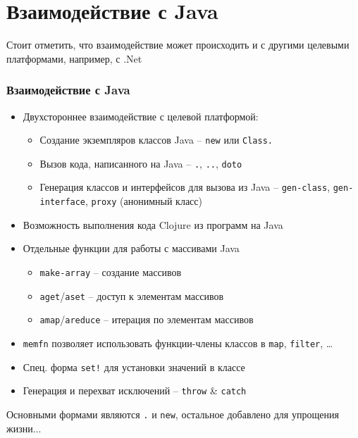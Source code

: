 \documentclass[ignorenonframetext]{beamer}
\begin{document}

\section{Взаимодействие с Java}

Стоит отметить, что взаимодействие может происходить и с другими целевыми платформами,
например, с .Net

\begin{frame}[t]
  \frametitle{Взаимодействие с Java}
  \begin{itemize}
  \item Двухстороннее взаимодействие с целевой платформой:
    \begin{itemize}
    \item Создание экземпляров классов Java -- \texttt{new} или \texttt{Class.}
    \item Вызов кода, написанного на Java -- \texttt{.}, \texttt{..}, \texttt{doto}
    \item Генерация классов и интерфейсов для вызова из Java -- \texttt{gen-class},
      \texttt{gen-interface}, \texttt{proxy} (анонимный класс)
    \end{itemize}
  \item Возможность выполнения кода Clojure из программ на Java
  \item Отдельные функции для работы с массивами Java
    \begin{itemize}
    \item \texttt{make-array} -- создание массивов
    \item \texttt{aget}/\texttt{aset} -- доступ к элементам массивов
    \item \texttt{amap}/\texttt{areduce} -- итерация по элементам массивов
    \end{itemize}
  \item \texttt{memfn} позволяет использовать функции-члены классов в \texttt{map},
    \texttt{filter}, \ldots{}
  \item Спец. форма \texttt{set!} для установки значений в классе
  \item Генерация и перехват исключений -- \texttt{throw} \& \texttt{catch}
  \end{itemize}
\end{frame}

Основными формами являются \texttt{.} и \texttt{new}, остальное добавлено для упрощения
жизни... 
\end{document}

